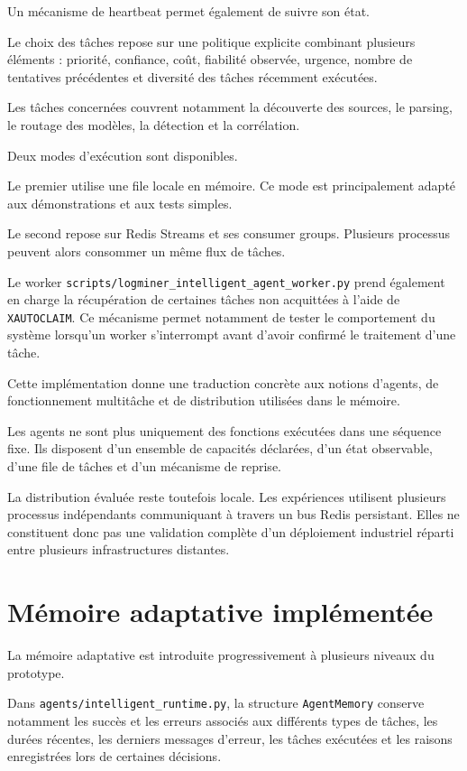 Un mécanisme de heartbeat permet également de suivre son état.

Le choix des tâches repose sur une politique explicite combinant plusieurs éléments : priorité, confiance, coût, fiabilité observée, urgence, nombre de tentatives précédentes et diversité des tâches récemment exécutées.

Les tâches concernées couvrent notamment la découverte des sources, le parsing, le routage des modèles, la détection et la corrélation.

Deux modes d'exécution sont disponibles.

Le premier utilise une file locale en mémoire. Ce mode est principalement adapté aux démonstrations et aux tests simples.

Le second repose sur Redis Streams et ses consumer groups. Plusieurs processus peuvent alors consommer un même flux de tâches.

Le worker \texttt{scripts/logminer\_intelligent\_agent\_worker.py} prend également en charge la récupération de certaines tâches non acquittées à l'aide de \texttt{XAUTOCLAIM}. Ce mécanisme permet notamment de tester le comportement du système lorsqu'un worker s'interrompt avant d'avoir confirmé le traitement d'une tâche.

Cette implémentation donne une traduction concrète aux notions d'agents, de fonctionnement multitâche et de distribution utilisées dans le mémoire.

Les agents ne sont plus uniquement des fonctions exécutées dans une séquence fixe. Ils disposent d'un ensemble de capacités déclarées, d'un état observable, d'une file de tâches et d'un mécanisme de reprise.

La distribution évaluée reste toutefois locale. Les expériences utilisent plusieurs processus indépendants communiquant à travers un bus Redis persistant. Elles ne constituent donc pas une validation complète d'un déploiement industriel réparti entre plusieurs infrastructures distantes.

\section{Mémoire adaptative implémentée}

La mémoire adaptative est introduite progressivement à plusieurs niveaux du prototype.

Dans \texttt{agents/intelligent\_runtime.py}, la structure \texttt{AgentMemory} conserve notamment les succès et les erreurs associés aux différents types de tâches, les durées récentes, les derniers messages d'erreur, les tâches exécutées et les raisons enregistrées lors de certaines décisions.

